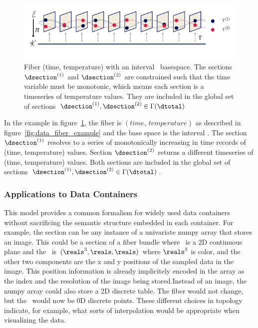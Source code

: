 \documentclass[../main.tex]{subfiles}
\begin{document}
\begin{figure}[H]
    \includegraphics[width=1\linewidth]{figures/math/fiberbundle.png}
    \caption{ Fiber (time, temperature) with an interval \dbase\ basespace. The sections $\dsection^{(1)}$ and $\dsection^{(2)}$ are constrained such that the time variable must be monotonic, which means each section is a timeseries of temperature values. They are included in the global set of sections  $\dsection^{(1)}, \dsection^{(2)} \in \Gamma(\dtotal)$}
    \label{fig:data_sections}
\end{figure}

In the example in figure~\ref{fig:data_sections}, the fiber is $(time, \, temperature)$ as described in figure~\ref{fig:data_fiber_example} and the base space is the interval \dbase. The section $\dsection^{(1)}$ resolves to a series of monotonically increasing in time records of (time, temperature) values. Section $\dsection^{(2)}$ returns a different timeseries of (time, temperature) values. Both sections are included in the global set of sections $\dsection^{(1)}, \dsection^{(2)} \in \Gamma(\dtotal)$.


\subsubsection{Applications to Data Containers}
This model provides a common formalism for widely used data containers without sacrificing the semantic structure embedded in each container. For example, the section can be any instance of a univariate numpy array\cite{harris2020array} that stores an image.  This could be a section of a fiber bundle where \dbase\ is a 2D continuous plane and the \dfiber\ is $(\reals^{3}, \reals, \reals)$ where $\reals^3$ is color, and the other two components are the x and y positions of the sampled data in the image. This position information is already implicitely encoded in the array as the index and the resolution of the image being stored.Instead of an image, the numpy array could also store a 2D discrete table. The fiber would not change, but the \dbase\ would now be 0D discrete points. These different choices in topology indicate, for example, what sorts of interpolation would be appropriate when visualizing the data. 
\end{document}
